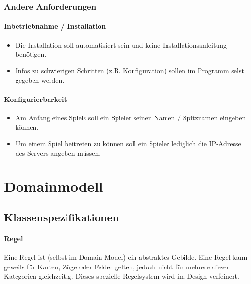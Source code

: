 \documentclass[a4paper,12pt,halfparskip,DIV14]{scrartcl}
\begin{document}
\subsubsection{Andere Anforderungen}\label{ssub:andere_anforderungen} %
\paragraph{Inbetriebnahme / Installation}\label{ssub:inbetriebnahme_installation} %
\begin{itemize}
	\item Die Installation soll automatisiert sein und keine Installationsanleitung benötigen.
	\item Infos zu schwierigen Schritten (z.B. Konfiguration) sollen im Programm selst gegeben werden.
\end{itemize}
\paragraph{Konfigurierbarkeit}\label{ssub:konfigurierbarkeit} %
\begin{itemize}
	\item Am Anfang eines Spiels soll ein Spieler seinen Namen / Spitznamen eingeben können.
	\item Um einem Spiel beitreten zu können soll ein Spieler lediglich die IP-Adresse des Servers angeben müssen.
\end{itemize}


\section{Domainmodell}\label{cha:domainmodell} %
\subsection{Klassenspezifikationen}\label{sub:klassenspezifikationen} %
\paragraph{Regel}\label{ssub:regel} %
Eine Regel ist (selbst im Domain Model) ein abstraktes Gebilde. Eine Regel kann geweils für Karten, Züge oder Felder gelten, jedoch nicht für mehrere dieser Kategorien gleichzeitig. Dieses spezielle Regelsystem wird im Design verfeinert.
\end{document}
